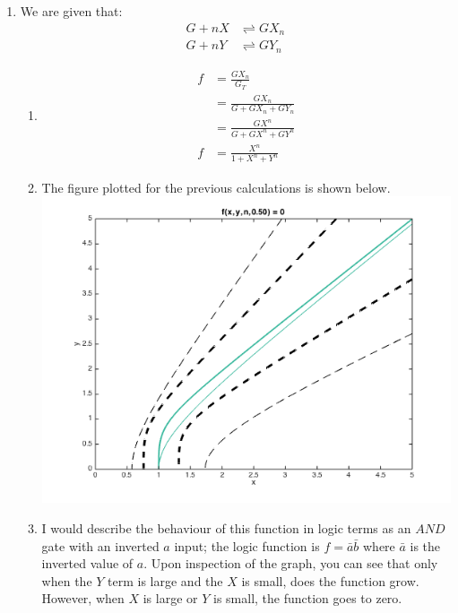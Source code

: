 \documentclass[10pt]{article}
\begin{document}
\begin{enumerate}
\item We are given that: \begin{align*} G + nX &\rightleftharpoons GX_n \\ G + nY &\rightleftharpoons GY_n \end{align*}
\begin{enumerate}
\item \begin{align*} f &= \frac {GX_n}{G_T} \\ &= \frac {GX_n}{G + GX_n+ GY_n} \\ &= \frac {GX^n}{G + GX^n+GY^n} \\ f &= \frac{X^n}{1 + X^n+Y^n} \end{align*}
\item The figure plotted for the previous calculations is shown below.\\ \includegraphics[scale=0.4]{hw11q3b.png}
\item I would describe the behaviour of this function in logic terms as an $AND$ gate with an inverted $a$ input;  the logic function is $f = \bar{a} \bar{b}$ where $\bar{a}$ is the inverted value of $a$. Upon inspection of the graph, you can see that only when the $Y$ term is large and the $X$ is small, does the function grow. However, when $X$ is large or $Y$ is small, the function goes to zero.
\end{enumerate}



\end{enumerate}
\end{document}
